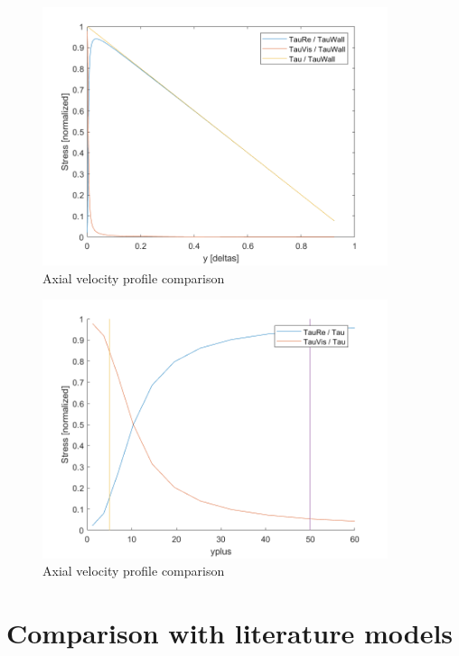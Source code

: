\documentclass[12pt]{article}
\begin{document}
        \begin{figure}
                \centering
                \includegraphics[width=0.9\textwidth]{stress1.png}
                \caption{Axial velocity profile comparison}
                \label{fig:s1}
        \end{figure}
        \begin{figure}
                \centering
                \includegraphics[width=0.9\textwidth]{stress2.png}
                \caption{Axial velocity profile comparison}
                \label{fig:s2}
        \end{figure}

\section{Comparison with literature models} \label{sec:literature}
\end{document}
